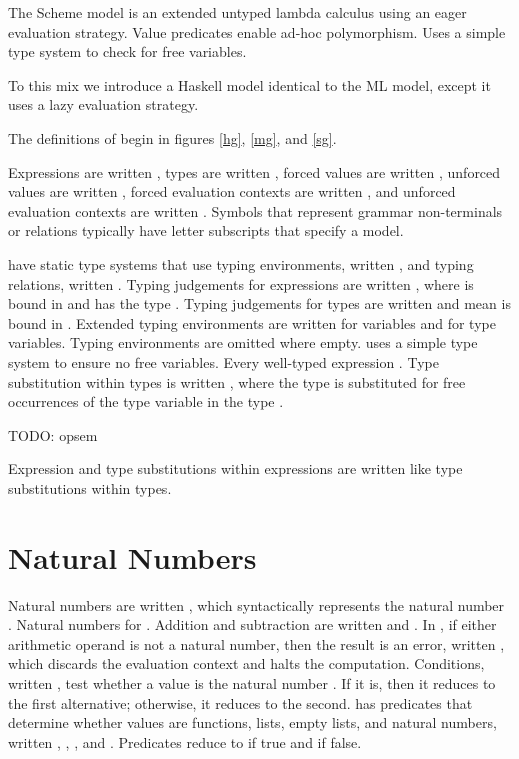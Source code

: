 The Scheme model is an extended untyped lambda calculus using an eager evaluation strategy. Value predicates enable ad-hoc polymorphism. Uses a simple type system to check for free variables.

To this mix we introduce a Haskell model identical to the ML model, except it uses a lazy evaluation strategy.

The definitions of \thehaskellmlscheme begin in figures \ref{hg}, \ref{mg}, and \ref{sg}.

Expressions are written \varexp, types are written \varty, forced values are written \varvalf, unforced values are written \varvalu, forced evaluation contexts are written \varconf, and unforced evaluation contexts are written \varconu. Symbols that represent grammar non-terminals or relations typically have letter subscripts that specify a model.

\Thehaskellml have static type systems that use typing environments, written \env, and typing relations, written \jud. Typing judgements for expressions are written \jude{\env}{\jud}{\varexp}{\varty}, where \varexp is bound in \env and has the type \varty. Typing judgements for types are written \judt{\env}{\jud}{\varty} and mean \varty is bound in \env. Extended typing environments are written \envexte{\env}{\varvar}{\varty} for variables and \envextt{\env}{\tyvar} for type variables. Typing environments are omitted where empty. \Thescheme uses a simple type system to ensure no free variables. Every well-typed \scheme expression \hastype{\tytst}. Type substitution within types is written , where the type  is substituted for free occurrences of the type variable  in the type .

TODO: opsem

Expression and type substitutions within expressions are written like type substitutions within types.

\section{Natural Numbers}

Natural numbers are written \expnum{\varnum}, which syntactically represents the natural number \varnum. Natural numbers \havetype{\tynum} for \thehaskellml. Addition and subtraction are written \expadd{\varexp}{\varexp} and \expsub{\varexp}{\varexp}. In \thescheme, if either arithmetic operand is not a natural number, then the result is an error, written \expwrongd{\errnum}, which discards the evaluation context and halts the computation. Conditions, written \expif{\varexp}{\varexp}{\varexp}, test whether a value is the natural number . If it is, then it reduces to the first alternative; otherwise, it reduces to the second. \Thescheme has predicates that determine whether values are functions, lists, empty lists, and natural numbers, written \exppfun{\varexps}, \expplist{\varexps}, \exppnull{\varexps}, and \exppnum{\varexps}. Predicates reduce to  if true and  if false.

